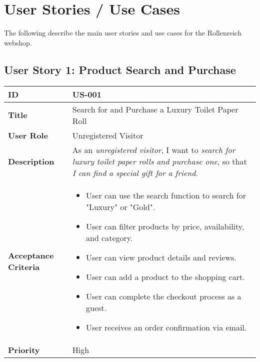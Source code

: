 \documentclass[a4paper,11pt]{article}
\begin{document}
\section{User Stories / Use Cases}
The following describe the main user stories and use cases for the Rollenreich webshop.

\subsection{User Story 1: Product Search and Purchase}
\begin{tabularx}{\textwidth}{|l|X|}
\hline
\textbf{ID} & US-001 \\
\hline
\textbf{Title} & Search for and Purchase a Luxury Toilet Paper Roll \\
\hline
\textbf{User Role} & Unregistered Visitor \\
\hline
\textbf{Description} & As an \textit{unregistered visitor}, I want to \textit{search for luxury toilet paper rolls and purchase one}, so that \textit{I can find a special gift for a friend}. \\
\hline
\textbf{Acceptance Criteria} &
\begin{itemize}[noitemsep, topsep=0pt] %
    \item User can use the search function to search for "Luxury" or "Gold".
    \item User can filter products by price, availability, and category.
    \item User can view product details and reviews.
    \item User can add a product to the shopping cart.
    \item User can complete the checkout process as a guest.
    \item User receives an order confirmation via email.
\end{itemize} \\
\hline
\textbf{Priority} & High \\
\hline
\end{tabularx}
\end{document}
